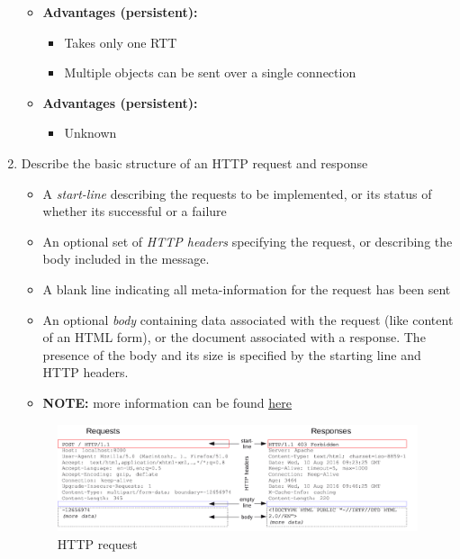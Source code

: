 \documentclass{article}
\begin{document}
\begin{enumerate}
\begin{itemize}
\item \textbf{Advantages (persistent):}

\begin{itemize}
\item Takes only one RTT
\item Multiple objects can be sent over a single connection
\end{itemize}

\item \textbf{Advantages (persistent):}

\begin{itemize}
\item Unknown
\end{itemize}

\end{itemize}

\newpage
\item Describe the basic structure of an HTTP request and response

\begin{itemize}
\item A \emph{start-line} describing the requests to be implemented, or its status of whether its successful or a failure
\item An optional set of \emph{HTTP headers} specifying the request, or describing the body included in the message.
\item A blank line indicating all meta-information for the request has been sent
\item An optional \emph{body} containing data associated with the request (like content of an HTML form), or the document associated with a response. The presence of the body and its size is specified by the starting line and HTTP headers.
\item \textbf{NOTE:} more information can be found \href{https://developer.mozilla.org/en-US/docs/Web/HTTP/Messages}{\underline{here}}
\end{itemize}
\begin{figure}[!h]
\centering
\includegraphics[width=14cm]{HTTP_Request}
\caption{HTTP request}
\end{figure}


\end{enumerate}
\end{document}
